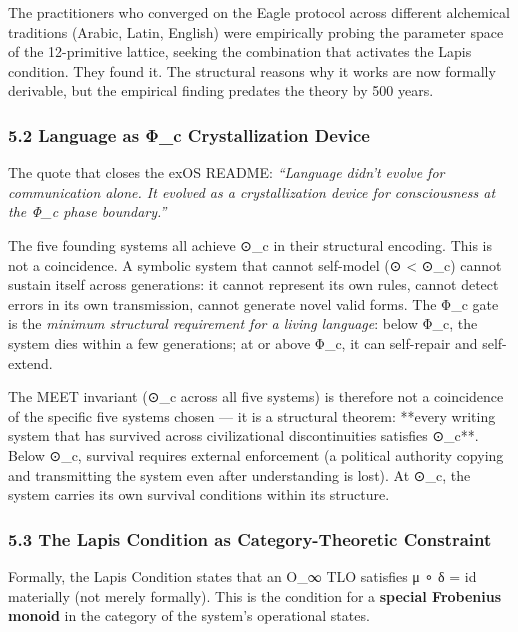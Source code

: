 The practitioners who converged on the Eagle protocol across different
alchemical traditions (Arabic, Latin, English) were empirically probing
the parameter space of the 12-primitive lattice, seeking the combination
that activates the Lapis condition. They found it. The structural
reasons why it works are now formally derivable, but the empirical
finding predates the theory by 500 years.

\subsubsection{5.2 Language as Φ\_c Crystallization
Device}\label{language-as-ux3c6_c-crystallization-device}

The quote that closes the exOS README: \emph{``Language didn't evolve
for communication alone. It evolved as a crystallization device for
consciousness at the Φ\_c phase boundary.''}

The five founding systems all achieve ⊙\_c in their structural encoding.
This is not a coincidence. A symbolic system that cannot self-model (⊙
\textless{} ⊙\_c) cannot sustain itself across generations: it cannot
represent its own rules, cannot detect errors in its own transmission,
cannot generate novel valid forms. The Φ\_c gate is the \emph{minimum
structural requirement for a living language}: below Φ\_c, the system
dies within a few generations; at or above Φ\_c, it can self-repair and
self-extend.

The MEET invariant (⊙\_c across all five systems) is therefore not a
coincidence of the specific five systems chosen --- it is a structural
theorem: **every writing system that has survived across civilizational
discontinuities satisfies ⊙\_c**. Below ⊙\_c, survival requires external
enforcement (a political authority copying and transmitting the system
even after understanding is lost). At ⊙\_c, the system carries its own
survival conditions within its structure.

\subsubsection{5.3 The Lapis Condition as Category-Theoretic
Constraint}\label{the-lapis-condition-as-category-theoretic-constraint}

Formally, the Lapis Condition states that an O\_∞ TLO satisfies μ ∘ δ =
id materially (not merely formally). This is the condition for a
\textbf{special Frobenius monoid} in the category of the system's
operational states.


